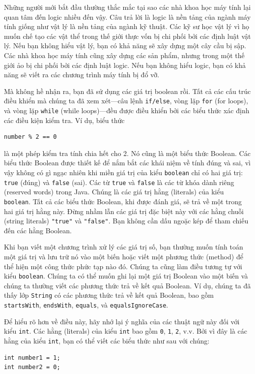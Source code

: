 Những người mới bắt đầu thường thắc mắc tại sao các nhà khoa học máy tính lại quan tâm đến logic nhiều đến vậy. Câu trả lời là logic là nền tảng của ngành máy tính giống như vật lý là nền tảng của ngành kỹ thuật. Các kỹ sư học vật lý vì họ muốn chế tạo các vật thể trong thế giới thực vốn bị chi phối bởi các định luật vật lý. Nếu bạn không hiểu vật lý, bạn có khả năng sẽ xây dựng một cây cầu bị sập. Các nhà khoa học máy tính cũng xây dựng các sản phẩm, nhưng trong một thế giới ảo bị chi phối bởi các định luật logic. Nếu bạn không hiểu logic, bạn có khả năng sẽ viết ra các chương trình máy tính bị đổ vỡ.

Mà không hề nhận ra, bạn đã sử dụng các giá trị boolean rồi. Tất cả các cấu trúc điều khiển mà chúng ta đã xem xét—câu lệnh \texttt{if/else}, vòng lặp \texttt{for} (for loops), và vòng lặp \texttt{while} (while loops)—đều được điều khiển bởi các biểu thức xác định các điều kiện kiểm tra. Ví dụ, biểu thức
\begin{verbatim}
number % 2 == 0
\end{verbatim}

là một phép kiểm tra tính chia hết cho 2. Nó cũng là một biểu thức Boolean. Các biểu thức Boolean được thiết kế để nắm bắt các khái niệm về tính đúng và sai, vì vậy không có gì ngạc nhiên khi miền giá trị của kiểu \texttt{boolean} chỉ có hai giá trị: \texttt{true} (đúng) và \texttt{false} (sai). Các từ \texttt{true} và \texttt{false} là các từ khóa dành riêng (reserved words) trong Java. Chúng là các giá trị hằng (literals) của kiểu \texttt{boolean}. Tất cả các biểu thức Boolean, khi được đánh giá, sẽ trả về một trong hai giá trị hằng này. Đừng nhầm lẫn các giá trị đặc biệt này với các hằng chuỗi (string literals) \texttt{"true"} và \texttt{"false"}. Bạn không cần dấu ngoặc kép để tham chiếu đến các hằng Boolean.

Khi bạn viết một chương trình xử lý các giá trị số, bạn thường muốn tính toán một giá trị và lưu trữ nó vào một biến hoặc viết một phương thức (method) để thể hiện một công thức phức tạp nào đó. Chúng ta cũng làm điều tương tự với kiểu \texttt{boolean}. Chúng ta có thể muốn ghi lại một giá trị Boolean vào một biến và chúng ta thường viết các phương thức trả về kết quả Boolean. Ví dụ, chúng ta đã thấy lớp \texttt{String} có các phương thức trả về kết quả Boolean, bao gồm \texttt{startsWith}, \texttt{endsWith}, \texttt{equals}, và \texttt{equalsIgnoreCase}.

Để hiểu rõ hơn về điều này, hãy nhớ lại ý nghĩa của các thuật ngữ này đối với kiểu \texttt{int}. Các hằng (literals) của kiểu \texttt{int} bao gồm \texttt{0}, \texttt{1}, \texttt{2}, v.v. Bởi vì đây là các hằng của kiểu \texttt{int}, bạn có thể viết các biểu thức như sau với chúng:
\begin{verbatim}
int number1 = 1;
int number2 = 0;
\end{verbatim}


